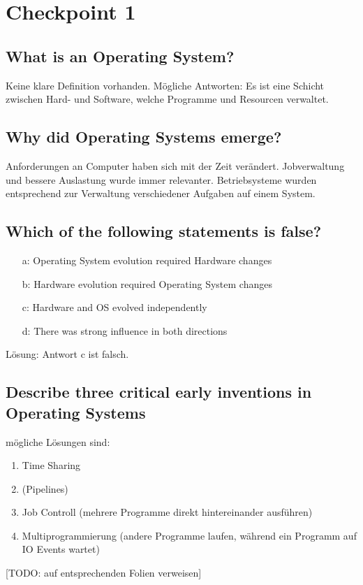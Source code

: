 \section{Checkpoint 1}

\subsection{What is an Operating System?}
Keine klare Definition vorhanden.
Mögliche Antworten:
Es ist eine Schicht zwischen Hard- und Software, welche Programme und Resourcen verwaltet.

\subsection{Why did Operating Systems emerge?}
Anforderungen an Computer haben sich mit der Zeit verändert.
Jobverwaltung und bessere Auslastung wurde immer relevanter.
Betriebsysteme wurden entsprechend zur Verwaltung verschiedener Aufgaben auf einem System.

\subsection{Which of the following statements is false?}
\begin{enumerate}
    \item[a:] Operating System evolution required Hardware changes
    \item[b:] Hardware evolution required Operating System changes
    \item[c:] Hardware and OS evolved independently
    \item[d:] There was strong influence in both directions 
\end{enumerate}

Lösung: Antwort c ist falsch.

\subsection{Describe three critical early inventions in Operating Systems}
mögliche Lösungen sind:
\begin{enumerate}
    \item Time Sharing
    \item (Pipelines)
    \item Job Controll (mehrere Programme direkt hintereinander ausführen)
    \item Multiprogrammierung (andere Programme laufen, während ein Programm auf IO Events wartet)
\end{enumerate}
[TODO: auf entsprechenden Folien verweisen]

